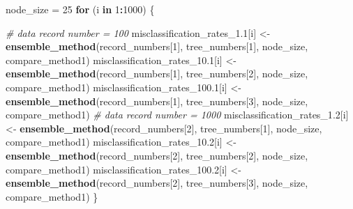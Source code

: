 \documentclass[
]{article}
\newenvironment{Shaded}{\begin{snugshade}}{\end{snugshade}}
\newcommand{\CommentTok}[1]{\textcolor[rgb]{0.56,0.35,0.01}{\textit{#1}}}
\newcommand{\ControlFlowTok}[1]{\textcolor[rgb]{0.13,0.29,0.53}{\textbf{#1}}}
\newcommand{\DecValTok}[1]{\textcolor[rgb]{0.00,0.00,0.81}{#1}}
\newcommand{\FloatTok}[1]{\textcolor[rgb]{0.00,0.00,0.81}{#1}}
\newcommand{\FunctionTok}[1]{\textcolor[rgb]{0.13,0.29,0.53}{\textbf{#1}}}
\newcommand{\NormalTok}[1]{#1}
\newcommand{\OtherTok}[1]{\textcolor[rgb]{0.56,0.35,0.01}{#1}}
\newcommand{\SpecialCharTok}[1]{\textcolor[rgb]{0.81,0.36,0.00}{\textbf{#1}}}
\begin{document}
\begin{Shaded}
\begin{Highlighting}[]
\NormalTok{node\_size }\OtherTok{=} \DecValTok{25}
\ControlFlowTok{for}\NormalTok{ (i }\ControlFlowTok{in} \DecValTok{1}\SpecialCharTok{:}\DecValTok{1000}\NormalTok{) \{}

  \CommentTok{\# data record number = 100}
\NormalTok{  misclassification\_rates\_1}\FloatTok{.1}\NormalTok{[i] }\OtherTok{\textless{}{-}} \FunctionTok{ensemble\_method}\NormalTok{(record\_numbers[}\DecValTok{1}\NormalTok{], }
\NormalTok{                                                 tree\_numbers[}\DecValTok{1}\NormalTok{], node\_size, }
\NormalTok{                                                 compare\_method1)}
\NormalTok{  misclassification\_rates\_10}\FloatTok{.1}\NormalTok{[i] }\OtherTok{\textless{}{-}} \FunctionTok{ensemble\_method}\NormalTok{(record\_numbers[}\DecValTok{1}\NormalTok{], }
\NormalTok{                                                  tree\_numbers[}\DecValTok{2}\NormalTok{], node\_size, }
\NormalTok{                                                  compare\_method1)}
\NormalTok{  misclassification\_rates\_100}\FloatTok{.1}\NormalTok{[i] }\OtherTok{\textless{}{-}} \FunctionTok{ensemble\_method}\NormalTok{(record\_numbers[}\DecValTok{1}\NormalTok{], }
\NormalTok{                                                   tree\_numbers[}\DecValTok{3}\NormalTok{], node\_size, }
\NormalTok{                                                compare\_method1)}
  \CommentTok{\# data record number = 1000}
\NormalTok{  misclassification\_rates\_1}\FloatTok{.2}\NormalTok{[i] }\OtherTok{\textless{}{-}} \FunctionTok{ensemble\_method}\NormalTok{(record\_numbers[}\DecValTok{2}\NormalTok{], }
\NormalTok{                                                 tree\_numbers[}\DecValTok{1}\NormalTok{], node\_size, }
\NormalTok{                                                 compare\_method1)}
\NormalTok{  misclassification\_rates\_10}\FloatTok{.2}\NormalTok{[i] }\OtherTok{\textless{}{-}} \FunctionTok{ensemble\_method}\NormalTok{(record\_numbers[}\DecValTok{2}\NormalTok{], }
\NormalTok{                                                  tree\_numbers[}\DecValTok{2}\NormalTok{], node\_size, }
\NormalTok{                                                  compare\_method1)}
\NormalTok{  misclassification\_rates\_100}\FloatTok{.2}\NormalTok{[i] }\OtherTok{\textless{}{-}} \FunctionTok{ensemble\_method}\NormalTok{(record\_numbers[}\DecValTok{2}\NormalTok{], }
\NormalTok{                                                   tree\_numbers[}\DecValTok{3}\NormalTok{], node\_size, }
\NormalTok{                                                compare\_method1)}
\NormalTok{\}}


\end{Highlighting}
\end{Shaded}
\end{document}
